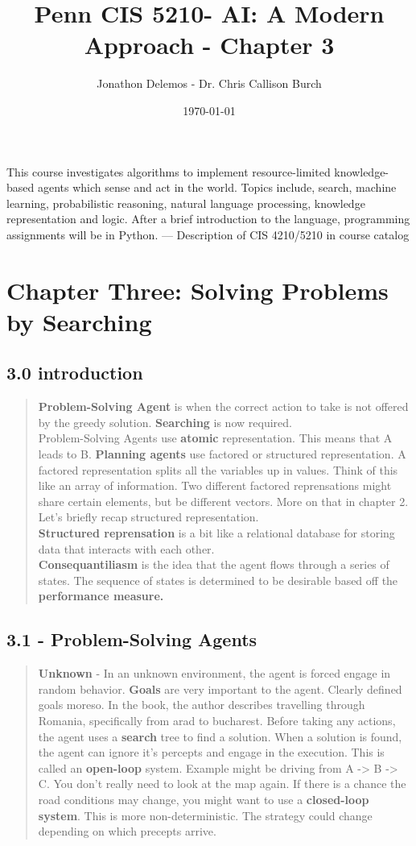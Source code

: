 \documentclass{article}
\title{Penn CIS 5210- AI: A Modern Approach - Chapter 3}
\author{Jonathon Delemos - Dr. Chris Callison Burch}
\date{\today}
\begin{document}
\maketitle

This course investigates algorithms to implement resource-limited knowledge-based agents which
sense and act in the world. Topics include, search, machine learning, probabilistic reasoning, natural
language processing, knowledge representation and logic. After a brief introduction to the language,
programming assignments will be in Python.
— Description of CIS 4210/5210 in course catalog

\section{Chapter Three: Solving Problems by Searching}
\subsection{3.0 introduction}
\begin{quote}
    \textbf{Problem-Solving Agent} is when the correct action to take is not offered by the greedy solution. \textbf{Searching} is now required.
    \\ Problem-Solving Agents use \textbf{atomic} representation. This means that A leads to B. \textbf{Planning agents} use factored or structured representation. A factored representation splits
    all the variables up in values. Think of this like an array of information. Two different factored reprensations might share certain elements, but be different vectors. More on that in chapter 2.
    \\ Let's briefly recap structured representation.\\ \textbf{Structured reprensation} is a bit like a relational database for storing data that interacts with each other.
    \\ \textbf{Consequantiliasm} is the idea that the agent flows through a series of states. The sequence of states is determined to be desirable based off the \textbf{performance measure.}
\end{quote}
\subsection{3.1 - Problem-Solving Agents}
\begin{quote}
    \textbf{Unknown} - In an unknown environment, the agent is forced engage in random behavior. \textbf{Goals} are very important to the agent. Clearly defined goals moreso. In the book, the author describes travelling through Romania, specifically from arad to bucharest.
    Before taking any actions, the agent uses a \textbf{search} tree to find a solution. When a solution is found, the agent can ignore it's percepts and engage in the execution. This is called an \textbf{open-loop} system. Example might be
    driving from A -> B -> C. You don't really need to look at the map again. If there is a chance the road conditions may change, you might want to use a \textbf{closed-loop system}. This is more non-deterministic. The strategy could change depending on which precepts arrive.
\end{quote}
\end{document}
